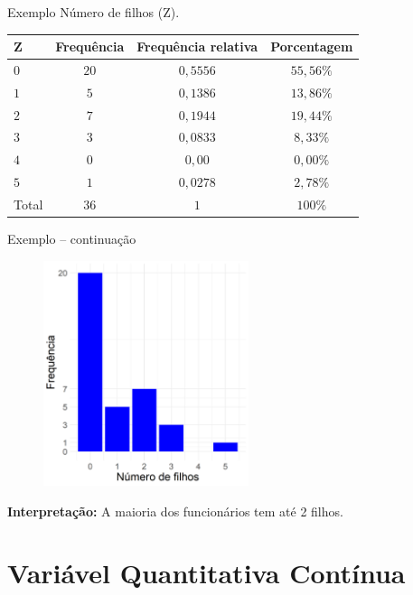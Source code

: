 \documentclass[9pt]{beamer}
\begin{document}
\begin{frame}{Exemplo}
	Número de filhos (Z).
	\begin{table}
		\centering
		\begin{tabular}{l|ccc}
			\toprule[0.05cm]
			Z & Frequência & Frequência relativa & Porcentagem\\ \midrule[0.05cm]
			$0$ & $20$ & $0,5556$ & $55,56\%$\\
			$1$ & $5$ & $0,1386$ & $13,86\%$\\
			$2$ & $7$ & $0,1944$ & $19,44\%$\\
			$3$ & $3$ & $0,0833$ & $8,33\%$\\
			$4$ & $0$ & $0,00$ & $0,00\%$\\
			$5$ & $1$ & $0,0278$ & $2,78\%$\\ \midrule[0.05cm]
			Total & $36$ & $1$ & $100\%$\\ \bottomrule[0.05cm]
		\end{tabular}
	\end{table}
\end{frame}

\begin{frame}{Exemplo -- continuação}
	\begin{figure}
		\centering
		\includegraphics[width = 6cm]{numero_filhos.png}
	\end{figure}
\textbf{Interpretação:} A maioria dos funcionários tem até 2 filhos.
\end{frame}

\section{Variável Quantitativa Contínua}
\end{document}
